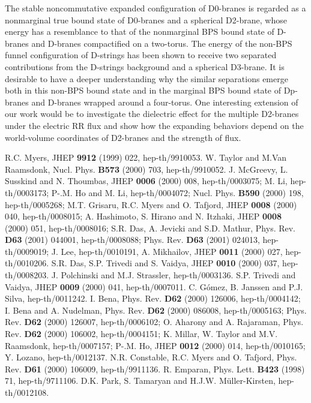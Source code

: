 \documentclass[12pt,a4paper]{article}
\begin{document}
The stable noncommutative expanded configuration of \coordHE{} D0-branes
is regarded as a nonmarginal true bound state of \coordHE{} D0-branes and a
spherical D2-brane, whose energy has a resemblance to that of the
nonmarginal BPS bound state of D\coordHE{}-branes and D\coordHE{}-branes 
compactified on a two-torus. The energy of the non-BPS funnel
configuration of \coordHE{} D-strings has been shown to receive 
two separated contributions from the \coordHE{} D-strings background and 
a spherical D3-brane. It is desirable to have a deeper understanding
why the similar separations emerge both in this non-BPS bound state
and in the marginal BPS bound state of Dp-branes and D\coordHE{}-branes
wrapped around a four-torus. 
One interesting extension of our work would be to investigate
the dielectric effect for the multiple D2-branes under the electric
RR flux and show how the expanding behaviors depend on the 
world-volume coordinates of D2-branes and  the strength of flux.

\begin{thebibliography}{99}
 R.C. Myers, JHEP \textbf{9912} (1999) 022, hep-th/9910053.
 W. Taylor and M.Van Raamsdonk, Nucl. Phys. \textbf{B573} 
(2000) 703, hep-th/9910052.
 J. McGreevy, L. Susskind and N. Thoumbas, JHEP \textbf{0006}
(2000) 008, hep-th/0003075; M. Li, hep-th/0003173; P-.M. Ho and M. Li, 
hep-th/0004072; Nucl. Phys. \textbf{B590} (2000) 198, hep-th/0005268;
 M.T. Grisaru, R.C. Myers and O. Tafjord, JHEP 
\textbf{0008} (2000) 040, hep-th/0008015; A. Hashimoto, S. Hirano and 
N. Itzhaki, JHEP \textbf{0008} (2000) 051, hep-th/0008016;
S.R. Das, A. Jevicki and S.D. Mathur, Phys. Rev. \textbf{D63} (2001) 
044001, hep-th/0008088; Phys. Rev. \textbf{D63} (2001) 024013,
 hep-th/0009019; J. Lee, hep-th/0010191, A. Mikhailov, JHEP
\textbf{0011} (2000) 027, hep-th/0010206.
 S.R. Das, S.P. Trivedi and S. Vaidya, JHEP \textbf{0010}
(2000) 037, hep-th/0008203.
 J. Polchinski and M.J. Strassler, hep-th/0003136.
 S.P. Trivedi and Vaidya, JHEP \textbf{0009} (2000) 041,
 hep-th/0007011.
 C. G\'omez, B. Janssen and P.J. Silva, hep-th/0011242.
 I. Bena, Phys. Rev. \textbf{D62} (2000) 126006, 
hep-th/0004142; I. Bena and A. Nudelman, Phys. Rev. \textbf{D62} (2000)
086008, hep-th/0005163; Phys. Rev. \textbf{D62} (2000) 126007, 
hep-th/0006102; O. Aharony and A. Rajaraman, Phys. Rev. \textbf{D62}
(2000) 106002, hep-th/0004151; K. Millar, W. Taylor and M.V. Raamsdonk,
hep-th/0007157; P-.M. Ho, JHEP \textbf{0012} (2000) 014, hep-th/0010165;
Y. Lozano, hep-th/0012137.
 N.R. Constable, R.C. Myers and O. Tafjord, Phys. Rev.
\textbf{D61} (2000) 106009, hep-th/9911136.
 R. Emparan, Phys. Lett. \textbf{B423} (1998) 71,
 hep-th/9711106.
 D.K. Park, S. Tamaryan and H.J.W. M\"uller-Kirsten,
hep-th/0012108. 

\end{thebibliography}
\end{document}
